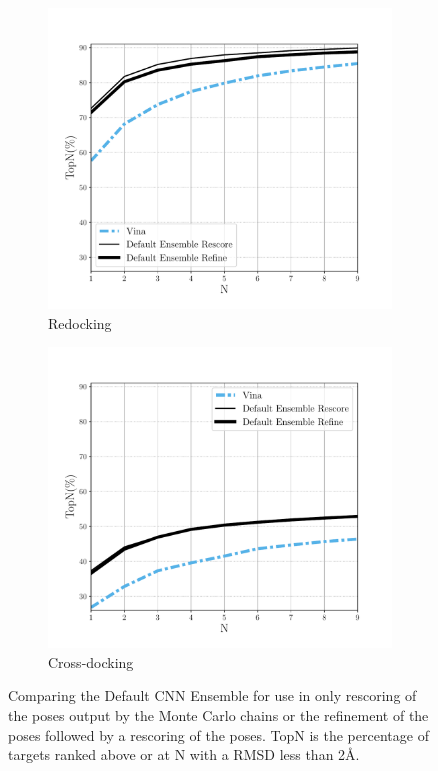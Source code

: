 \documentclass[journal=jcisd8,manuscript=article]{achemso}
\begin{document}
\begin{figure}    
        \begin{subfigure}[b]{0.48\textwidth}    
		\centering
		\includegraphics[width=\textwidth]{figures/redocking/rescore_vs_refine_line.pdf} 
		\caption{Redocking}
		\label{fig:CompareRescoreRefineRedock}
        \end{subfigure}    
        \begin{subfigure}[b]{0.48\textwidth}    
		\centering
		\includegraphics[width=\textwidth]{figures/crossdocking/rescore_vs_refine_line.pdf} 
		\caption{Cross-docking}
		\label{fig:CompareRescoreRefineCrossdock}
        \end{subfigure}    
	\caption{Comparing the Default CNN Ensemble for use in only rescoring of the poses output by the Monte Carlo chains or the refinement of the poses followed by a rescoring of the poses. TopN is the percentage of targets ranked above or at N with a RMSD less than 2{\AA}.}
	\label{fig:CompareRescoreRefine}
\end{figure}    
\end{document}

